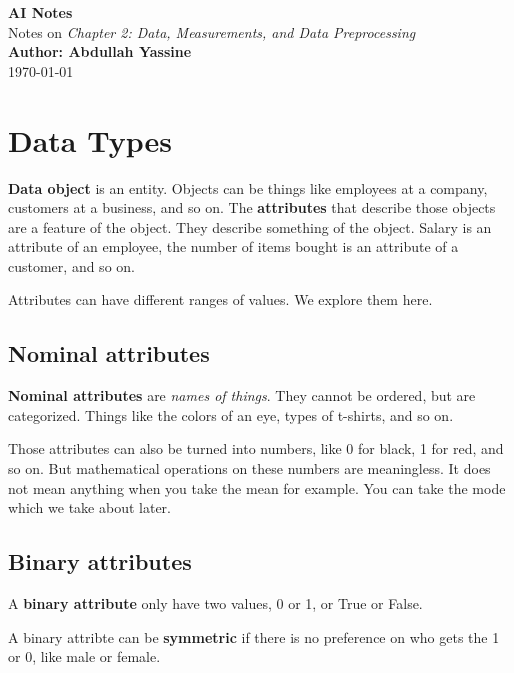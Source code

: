 \documentclass[12pt,a4paper]{article}
\begin{document}
\begin{center}
    {\LARGE \textbf{AI Notes}} \\
    \vspace{0.5em}
    {\large Notes on \textit{Chapter 2: Data, Measurements, and Data Preprocessing}} \\
    \vspace{0.5em}
    \textbf{Author: Abdullah Yassine} \\
    \today
\end{center}

\tableofcontents
\newpage

\section{Data Types}
\textbf{Data object} is an entity. Objects can be things like employees at a company, customers at a business, and so on. The \textbf{attributes} that describe those objects are a feature of the object. They describe something of the object. Salary is an attribute of an employee, the number of items bought is an attribute of a customer, and so on.

Attributes can have different ranges of values. We explore them here.

\subsection{Nominal attributes}

\textbf{Nominal attributes} are \textit{names of things}. They cannot be ordered, but are categorized. Things like the colors of an eye, types of t-shirts, and so on. 

Those attributes can also be turned into numbers, like 0 for black, 1 for red, and so on. But mathematical operations on these numbers are meaningless. It does not mean anything when you take the mean for example. You can take the mode which we take about later.

\subsection{Binary attributes}

A \textbf{binary attribute} only have two values, 0 or 1, or True or False. 

A binary attribte can be \textbf{symmetric} if there is no preference on who gets the 1 or 0, like male or female.
\end{document}

